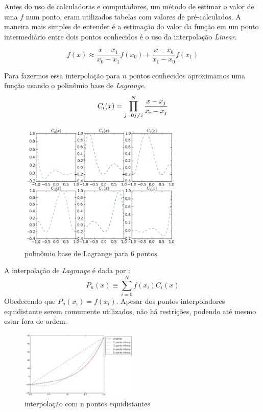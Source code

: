  Antes do uso de calculadoras e computadores, um método de estimar o valor de uma $f$ num ponto, eram utilizados tabelas com valores de pré-calculados. A maneira mais simples de entender é a estimação do valor da função em um ponto intermediário entre dois pontos conhecidos é o uso da interpolação \emph{Linear}.

\begin{equation}
	f(x) \approx \frac{x - x_1}{x_0 - x_1}f(x_0)  + 							 \frac{x - x_0}{x_1 - x_0}f(x_1)
\end{equation} 
 
 Para fazermos essa interpolação para $n$ pontos conhecidos aproximamos uma função usando o polinômio base de \emph{Lagrange}.
\begin{equation}
C_i(x) = \prod_{j = 0 \\ j \neq i}^{N} \frac{x - x_j}{x_i - x_j} 
\end{equation}

\begin{figure}[!h]
\includegraphics[width=0.7\textwidth, center ]{figuras/exemplo_polinomio_lagrange.png}
\caption{polinômio base de Lagrange para 6 pontos}
\end{figure}

 A interpolação de \emph{Lagrange} é dada por :
\begin{equation}
 P_n(x) \equiv \sum_{i = 0}^{N} f(x_i)C_i(x) 
\end{equation}
 Obedecendo que $P_n(x_i) = f(x_i)$. Apesar dos pontos interpoladores equidistante serem comumente utilizados, não há restrições, podendo até mesmo estar fora de ordem.
\begin{figure}[h]
  \includegraphics[width=0.5\textwidth, center]{figuras/interpolacao_linear5.png}
  \caption{interpolação com n pontos equidistantes}
\end{figure}

